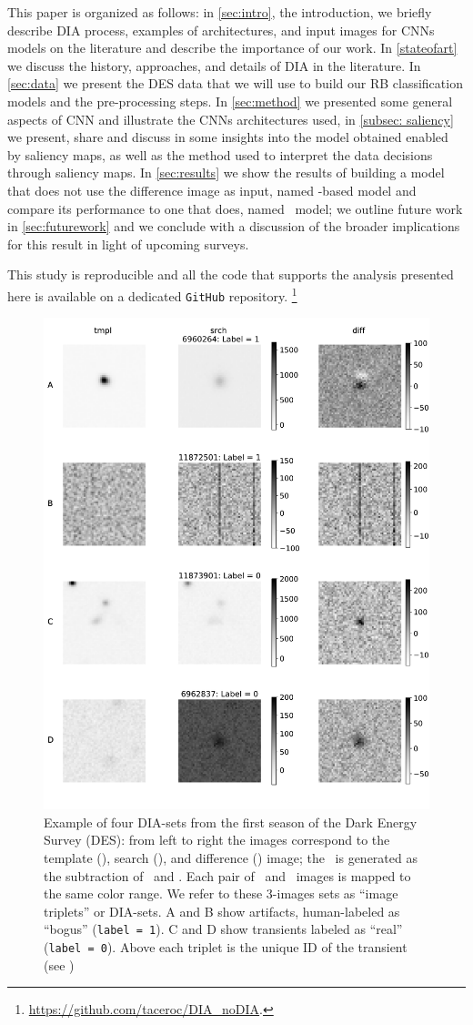 This paper is organized as follows: in \autoref{sec:intro}, the introduction, we briefly describe DIA process, examples of architectures, and input images for CNNs models on the literature and describe the importance of our work. In \autoref{stateofart} we discuss the history, approaches, and details of DIA in the literature. In \autoref{sec:data} we present the DES data that we will use to build our RB classification models and the pre-processing steps. In \autoref{sec:method} we presented some general aspects of CNN and illustrate the CNNs architectures used, in \autoref{subsec: saliency} we present, share and discuss in some insights into the model obtained enabled by saliency maps, as well as the method used to interpret the data decisions through saliency maps. In \autoref{sec:results} we show the results of building a model that does not use the difference image as input, named \nodia -based model and compare its performance to one that does, named \diabased\ model;  we outline future work in \autoref{sec:futurework} and we conclude with a discussion of the broader implications for this result in light of upcoming surveys.

This study is reproducible and all the code that supports the analysis presented here is available on a dedicated \texttt{GitHub} repository. \footnote{\url{https://github.com/taceroc/DIA_noDIA}.}
\begin{figure}

    \centering
    \includegraphics[width=0.52\linewidth]{figures/nonorm_new_test.pdf}
    \caption{Example of four DIA-sets from the first season of the Dark Energy Survey (DES): from left to right the images correspond to the template (\temp), search (\search), and difference (\diff) image; the \diff\ is generated as the subtraction of \temp\ and \search. Each pair of \temp\ and \search\ images is mapped to the same color range. We refer to these 3-images sets as ``image triplets'' or DIA-sets. A and B show artifacts, human-labeled as ``bogus'' (\texttt{label = 1}). C and D show transients labeled as ``real'' (\texttt{label = 0}).
     Above each triplet is the unique ID of the transient (see \citealt{Goldstein_2015})
    }
    \label{fig:examples_no_normalization}
\end{figure}

